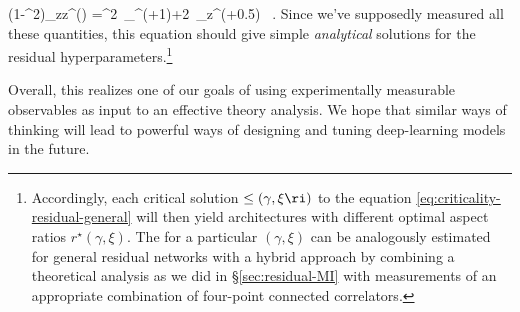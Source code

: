 \le(1-\gamma^2\ri)_{zz}^{(\ell)} =\xi^2\, _{\block\block}^{(\ell+1)}+2\gamma\xi\, _{\block z}^{(\ell+0.5)}  \, .
\ee
Since we've supposedly measured all these quantities, this equation should give simple \emph{analytical} solutions for the residual hyperparameters.\footnote{
Accordingly, each critical solution $\le(\gamma, \xi \ri)$ to the equation \eqref{eq:criticality-residual-general} 
will then yield architectures with different optimal aspect ratios $r^\star(\gamma, \xi)$. The  for a particular $(\gamma, \xi)$  can be analogously estimated for general residual networks with a hybrid approach by combining a theoretical analysis as we did in \S\ref{sec:residual-MI} with  measurements of an appropriate combination of four-point connected correlators. 
}
\ei







Overall, this %
 realizes one of our goals of using experimentally measurable observables as input to an effective theory analysis. We hope that similar ways of thinking will lead to powerful ways of designing and tuning deep-learning models in the future.  












